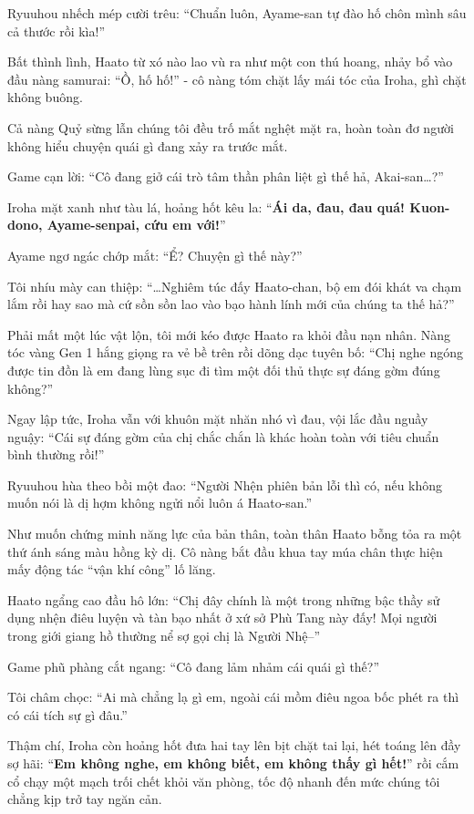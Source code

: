 \documentclass[../main.tex]{subfiles}
\begin{document}
Ryuuhou nhếch mép cười trêu: ``Chuẩn luôn, Ayame-san tự đào hố chôn mình sâu cả thước rồi kìa!''

Bất thình lình, Haato từ xó nào lao vù ra như một con thú hoang, nhảy bổ vào đầu nàng samurai: ``Ồ, hố hố!'' - cô nàng tóm chặt lấy mái tóc của Iroha, ghì chặt không buông.


Cả nàng Quỷ sừng lẫn chúng tôi đều trố mắt nghệt mặt ra, hoàn toàn đơ người không hiểu chuyện quái gì đang xảy ra trước mắt.

Game cạn lời: ``Cô đang giở cái trò tâm thần phân liệt gì thế hả, Akai-san\dots?''

Iroha mặt xanh như tàu lá, hoảng hốt kêu la: ``\textbf{Ái da, đau, đau quá! Kuon-dono, Ayame-senpai, cứu em với!}''

Ayame ngơ ngác chớp mắt: ``Ể? Chuyện gì thế này?''

Tôi nhíu mày can thiệp: ``\dots Nghiêm túc đấy Haato-chan, bộ em đói khát va chạm lắm rồi hay sao mà cứ sồn sồn lao vào bạo hành lính mới của chúng ta thế hả?''

Phải mất một lúc vật lộn, tôi mới kéo được Haato ra khỏi đầu nạn nhân. Nàng tóc vàng Gen 1 hắng giọng ra vẻ bề trên rồi dõng dạc tuyên bố: ``Chị nghe ngóng được tin đồn là em đang lùng sục đi tìm một đối thủ thực sự đáng gờm đúng không?''

Ngay lập tức, Iroha vẫn với khuôn mặt nhăn nhó vì đau, vội lắc đầu nguầy nguậy: ``Cái sự đáng gờm của chị chắc chắn là khác hoàn toàn với tiêu chuẩn bình thường rồi!''

Ryuuhou hùa theo bồi một đao: ``Người Nhện phiên bản lỗi thì có, nếu không muốn nói là dị hợm không ngửi nổi luôn á Haato-san.''

Như muốn chứng minh năng lực của bản thân, toàn thân Haato bỗng tỏa ra một thứ ánh sáng màu hồng kỳ dị. Cô nàng bắt đầu khua tay múa chân thực hiện mấy động tác ``vận khí công'' lố lăng.


Haato ngẩng cao đầu hô lớn: ``Chị đây chính là một trong những bậc thầy sử dụng nhện điêu luyện và tàn bạo nhất ở xứ sở Phù Tang này đấy! Mọi người trong giới giang hồ thường nể sợ gọi chị là Người Nhệ--''

Game phũ phàng cắt ngang: ``Cô đang lảm nhảm cái quái gì thế?''

Tôi châm chọc: ``Ai mà chẳng lạ gì em, ngoài cái mồm điêu ngoa bốc phét ra thì có cái tích sự gì đâu.''

Thậm chí, Iroha còn hoảng hốt đưa hai tay lên bịt chặt tai lại, hét toáng lên đầy sợ hãi: ``\textbf{Em không nghe, em không biết, em không thấy gì hết!}'' rồi cắm cổ chạy một mạch trối chết khỏi văn phòng, tốc độ nhanh đến mức chúng tôi chẳng kịp trở tay ngăn cản.
\end{document}
